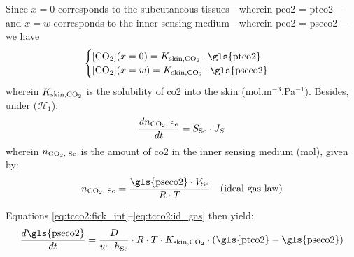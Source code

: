 Since $x=0$ corresponds to the subcutaneous tissues---wherein \gls{pco2} = \gls{ptco2}---and $x=w$ corresponds to the inner sensing medium---wherein \gls{pco2} = \gls{pseco2}---we have
\begin{equation}\label{eq:tcco2:conc_boundaries}
	\begin{cases}
		\ce{[CO_2]}(x=0) = K_\text{skin,\ce{CO_2}} \cdot \text{\gls{ptco2}}\\
		\ce{[CO_2]}(x=w) = K_\text{skin,\ce{CO_2}} \cdot \text{\gls{pseco2}}
	\end{cases}
\end{equation}
wherein $K_\text{skin,\ce{CO_2}}$ is the solubility of \gls{co2} into the skin (mol.m$^{-3}$.Pa$^{-1}$). Besides, under ($\mathcal{H}_1$):
\begin{equation}\label{eq:tcco2:fluxes_int}
	\frac{d n_\text{\ce{CO_2}, Se}}{dt} = S_\text{Se} \cdot J_S 
\end{equation}
wherein $n_\text{\ce{CO_2}, Se}$ is the amount of \gls{co2} in the inner sensing medium (mol), given by:
\begin{equation}\label{eq:tcco2:id_gas}
	n_\text{\ce{CO_2}, Se} = \frac{\text{\gls{pseco2}} \cdot V_\text{Se}}{R \cdot T} \quad \text{(ideal gas law)}
\end{equation}

Equations \ref{eq:tcco2:fick_int}--\ref{eq:tcco2:id_gas} then yield:
\begin{equation}
	\frac{d \text{\gls{pseco2}}}{dt} = \frac{D}{w \cdot h_\text{Se}} \cdot R \cdot T \cdot K_\text{skin,\ce{CO_2}} \cdot \left( \text{\gls{ptco2}} - \text{\gls{pseco2}} \right)
\end{equation}

